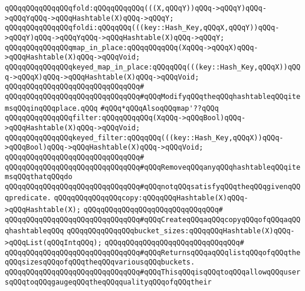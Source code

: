 \verb|qQQqqQQqqQQqqQQqfold:qQQqqQQqqQQq(((X,qQQqY))qQQq->qQQqY)qQQq->qQQqYqQQq->qQQqHashtable(X)qQQq->qQQqY;|\newline
\verb|qQQqqQQqqQQqqQQqfoldi:qQQqqQQq(((key::Hash_Key,qQQqX,qQQqY))qQQq->qQQqY)qQQq->qQQqYqQQq->qQQqHashtable(X)qQQq->qQQqY;|\newline
\newline
\verb|qQQqqQQqqQQqqQQqmap_in_place:qQQqqQQqqQQq(XqQQq->qQQqX)qQQq->qQQqHashtable(X)qQQq->qQQqVoid;|\newline
\verb|qQQqqQQqqQQqqQQqkeyed_map_in_place:qQQqqQQq(((key::Hash_Key,qQQqX))qQQq->qQQqX)qQQq->qQQqHashtable(X)qQQq->qQQqVoid;|\newline
\verb|qQQqqQQqqQQqqQQqqQQqqQQqqQQqqQQq#|\newline
\verb|qQQqqQQqqQQqqQQqqQQqqQQqqQQqqQQq#qQQqModifyqQQqtheqQQqhashtableqQQqitemsqQQqinqQQqplace.qQQq|\newline
\newline
\verb|#qQQq*qQQqAlsoqQQqmap'??qQQq|\newline
\verb|qQQqqQQqqQQqqQQqfilter:qQQqqQQqqQQq(XqQQq->qQQqBool)qQQq->qQQqHashtable(X)qQQq->qQQqVoid;|\newline
\verb|qQQqqQQqqQQqqQQqkeyed_filter:qQQqqQQq(((key::Hash_Key,qQQqX))qQQq->qQQqBool)qQQq->qQQqHashtable(X)qQQq->qQQqVoid;|\newline
\verb|qQQqqQQqqQQqqQQqqQQqqQQqqQQqqQQq#|\newline
\verb|qQQqqQQqqQQqqQQqqQQqqQQqqQQqqQQq#qQQqRemoveqQQqanyqQQqhashtableqQQqitemsqQQqthatqQQqdo|\newline
\verb|qQQqqQQqqQQqqQQqqQQqqQQqqQQqqQQq#qQQqnotqQQqsatisfyqQQqtheqQQqgivenqQQqpredicate.|\newline
\newline
\verb|qQQqqQQqqQQqqQQqcopy:qQQqqQQqHashtable(X)qQQq->qQQqHashtable(X);|\newline
\verb|qQQqqQQqqQQqqQQqqQQqqQQqqQQqqQQq#|\newline
\verb|qQQqqQQqqQQqqQQqqQQqqQQqqQQqqQQq#qQQqCreateqQQqaqQQqcopyqQQqofqQQqaqQQqhashtableqQQq|\newline
\newline
\verb|qQQqqQQqqQQqqQQqbucket_sizes:qQQqqQQqHashtable(X)qQQq->qQQqList(qQQqIntqQQq);|\newline
\verb|qQQqqQQqqQQqqQQqqQQqqQQqqQQqqQQq#|\newline
\verb|qQQqqQQqqQQqqQQqqQQqqQQqqQQqqQQq#qQQqReturnsqQQqaqQQqlistqQQqofqQQqtheqQQqsizesqQQqofqQQqtheqQQqvariousqQQqbuckets.|\newline
\verb|qQQqqQQqqQQqqQQqqQQqqQQqqQQqqQQq#qQQqThisqQQqisqQQqtoqQQqallowqQQqusersqQQqtoqQQqgaugeqQQqtheqQQqqualityqQQqofqQQqtheir|\newline

